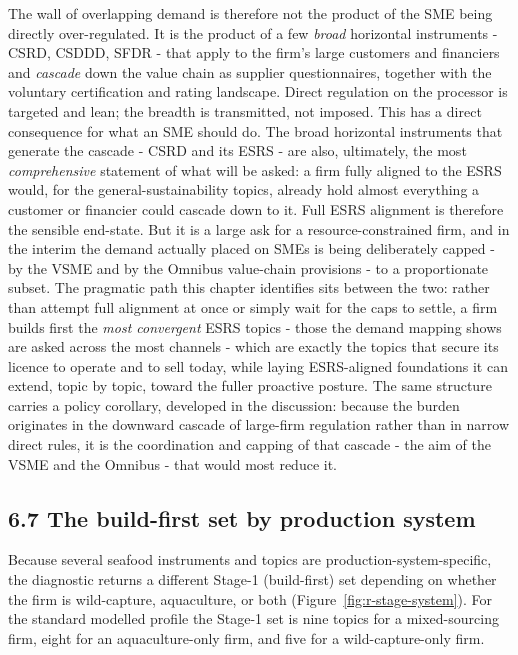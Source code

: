 The wall of overlapping demand is therefore not the product of the SME being
directly over-regulated. It is the product of a few \emph{broad} horizontal
instruments - CSRD, CSDDD, SFDR - that apply to the firm's large customers and
financiers and \emph{cascade} down the value chain as supplier questionnaires,
together with the voluntary certification and rating landscape. Direct regulation
on the processor is targeted and lean; the breadth is transmitted, not imposed.
This has a direct consequence for what an SME should do. The broad horizontal
instruments that generate the cascade - CSRD and its ESRS - are also, ultimately,
the most \emph{comprehensive} statement of what will be asked: a firm fully aligned
to the ESRS would, for the general-sustainability topics, already hold almost
everything a customer or financier could cascade down to it. Full ESRS alignment is
therefore the sensible end-state. But it is a large ask for a resource-constrained firm,
and in the interim the demand actually placed on SMEs is being deliberately capped - by the VSME and by the Omnibus value-chain provisions - to a proportionate
subset. The pragmatic path this chapter identifies sits between the two: rather than
attempt full alignment at once or simply wait for the caps to settle, a firm builds
first the \emph{most convergent} ESRS topics - those the demand mapping shows are
asked across the most channels - which are exactly the topics that secure its
licence to operate and to sell today, while laying ESRS-aligned foundations it can
extend, topic by topic, toward the fuller proactive posture. The same structure
carries a policy corollary, developed in the discussion: because the burden
originates in the downward cascade of large-firm regulation rather than in narrow
direct rules, it is the coordination and capping of that cascade - the aim of the
VSME and the Omnibus - that would most reduce it.
\FloatBarrier
\subsection{6.7 The build-first set by production
system}\label{cm-build-first}

Because several seafood instruments and topics are production-system-specific, the
diagnostic returns a different Stage-1 (build-first) set depending on whether the
firm is wild-capture, aquaculture, or both (Figure~\ref{fig:r-stage-system}). For
the standard modelled profile the Stage-1 set is nine topics for a mixed-sourcing
firm, eight for an aquaculture-only firm, and five for a wild-capture-only firm.

